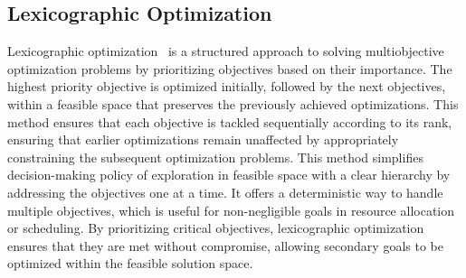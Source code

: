 \subsection{Lexicographic Optimization}
\label{sec:lexi_opt}
Lexicographic optimization~\cite{abernethy2024lexicographic, chinchuluun2007survey} is a structured approach to solving multiobjective optimization problems by prioritizing objectives based on their importance. The highest priority objective is optimized initially, followed by the next objectives, within a feasible space that preserves the previously achieved optimizations. This method ensures that each objective is tackled sequentially according to its rank, ensuring that earlier optimizations remain unaffected by appropriately constraining the subsequent optimization problems. This method simplifies decision-making policy of exploration in feasible space with a clear hierarchy by addressing the objectives one at a time. It offers a deterministic way to handle multiple objectives, which is useful for non-negligible goals in resource allocation or scheduling. By prioritizing critical objectives, lexicographic optimization ensures that they are met without compromise, allowing secondary goals to be optimized within the feasible solution space.

